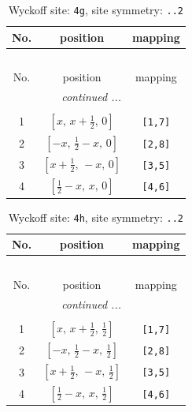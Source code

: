 \documentclass[fleqn,8pt]{jsarticle}
\begin{document}
\renewcommand{\arraystretch}{1.2}
\begin{longtable}{ccc}
\caption{Wyckoff site: {\tt 4g}, site symmetry: {\tt ..2}}
 \\
 \hline \hline
No. & position & mapping \\ \hline \endfirsthead

\multicolumn{2}{l}{\tablename\ \thetable{}} \\
 \hline \hline
No. & position & mapping \\ \hline \endhead

 \hline \hline
\multicolumn{2}{r}{\footnotesize\it continued ...} \\ \endfoot

 \hline \hline
\multicolumn{2}{r}{} \\ \endlastfoot

1 & $\left[ x,\, x + \frac{1}{2},\, 0 \right]$ & {\tt [1,7]} \\ \hline
2 & $\left[ - x,\, \frac{1}{2} - x,\, 0 \right]$ & {\tt [2,8]} \\ \hline
3 & $\left[ x + \frac{1}{2},\, - x,\, 0 \right]$ & {\tt [3,5]} \\ \hline
4 & $\left[ \frac{1}{2} - x,\, x,\, 0 \right]$ & {\tt [4,6]} \\
\end{longtable}
\renewcommand{\arraystretch}{1.2}
\begin{longtable}{ccc}
\caption{Wyckoff site: {\tt 4h}, site symmetry: {\tt ..2}}
 \\
 \hline \hline
No. & position & mapping \\ \hline \endfirsthead

\multicolumn{2}{l}{\tablename\ \thetable{}} \\
 \hline \hline
No. & position & mapping \\ \hline \endhead

 \hline \hline
\multicolumn{2}{r}{\footnotesize\it continued ...} \\ \endfoot

 \hline \hline
\multicolumn{2}{r}{} \\ \endlastfoot

1 & $\left[ x,\, x + \frac{1}{2},\, \frac{1}{2} \right]$ & {\tt [1,7]} \\ \hline
2 & $\left[ - x,\, \frac{1}{2} - x,\, \frac{1}{2} \right]$ & {\tt [2,8]} \\ \hline
3 & $\left[ x + \frac{1}{2},\, - x,\, \frac{1}{2} \right]$ & {\tt [3,5]} \\ \hline
4 & $\left[ \frac{1}{2} - x,\, x,\, \frac{1}{2} \right]$ & {\tt [4,6]} \\
\end{longtable}
\end{document}
